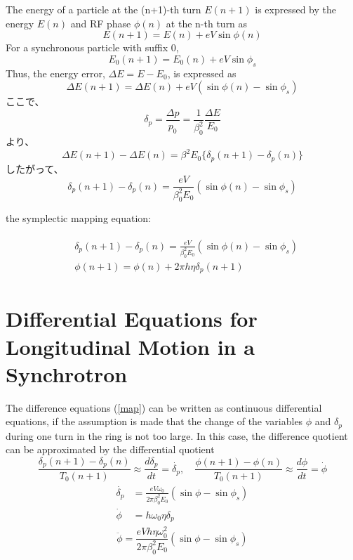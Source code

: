 \documentclass[10pt,a4paper]{ltjsarticle}
\begin{document}
The energy of a particle at the (n+1)-th turn $E(n+1)$ is expressed by the energy $E(n)$ and RF phase $\phi(n)$ at the n-th turn as
%
\begin{equation}
    E(n+1) = E(n) + e V \sin\phi (n)
\end{equation}
%
For a synchronous particle with suffix 0,
%
\begin{equation}
    E_0(n+1) = E_0(n) + e V \sin\phi_s
\end{equation}
%
Thus, the energy error, $\Delta E = E - E_0$, is expressed as
%
\begin{equation}
    \Delta E(n+1) = \Delta E(n) + e V (\sin\phi(n) - \sin\phi_s)
\end{equation}
%
ここで、
%
\begin{equation}
    \delta_p = \frac{\Delta p}{p_0} = \frac{1}{\beta_0^2}\frac{\Delta E}{E_0}
\end{equation}
%
より、
%
\begin{equation}
    \Delta E(n+1) - \Delta E(n) = \beta^2 E_0 \{\delta_p(n+1) - \delta_p(n)\}
\end{equation}
%
したがって、
%
\begin{equation}
    \delta_p(n+1) - \delta_p(n) = \frac{e V}{\beta_0^2 E_0}(\sin\phi(n) -\sin\phi_s)
\end{equation}
%

the symplectic mapping equation:

\begin{align}
    \begin{split}
        &\delta_p(n+1) - \delta_p(n) = \frac{e V}{\beta_0^2 E_0}(\sin\phi(n) -\sin\phi_s) \\
        &\phi(n+1) = \phi(n) + 2\pi h \eta \delta_p(n+1)
        \label{map}
    \end{split}
\end{align}
%
\section{Differential Equations for Longitudinal Motion in a Synchrotron}
The difference equations (\ref{map}) can be written as continuous differential equations, if the assumption is made that the change of the variables $\phi$ and $\delta_p$ during one turn in the ring is not too large. In this case, the difference quotient can be approximated by the differential quotient
%
\begin{equation}
    \frac{\delta_p(n+1)-\delta_p(n)}{T_0(n+1)} \approx \frac{d\delta_p}{dt}=\dot{\delta_p},\quad 
    \frac{\phi(n+1)-\phi(n)}{T_0(n+1)} \approx \frac{d\phi}{dt}= \dot{\phi}
\end{equation}
%
\begin{align}
    \begin{split}
        \dot{\delta_p} &= \frac{e V \omega_0}{2\pi \beta_0^2 E_0}(\sin\phi - \sin\phi_s) \\
        \dot{\phi} &= h \omega_0 \eta \delta_p
    \end{split}
\end{align}
%
\begin{equation}
    \ddot{\phi} = \frac{e V h \eta \omega_0^2}{2\pi\beta_0^2 E_0}(\sin\phi-\sin\phi_s)
\end{equation}
%
\end{document}

